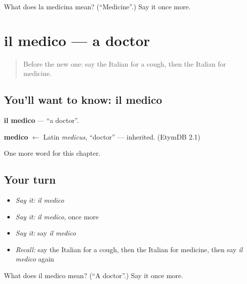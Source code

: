 \begin{tcolorbox}[breakable,colback=teal!4,colframe=teal!35!black,title={Before you move on}]
What does la medicina mean? (\textquotedblleft{}Medicine\textquotedblright{}.) Say it once more.
\end{tcolorbox}
\section[il medico]{il medico — a doctor}

\label{lesson:IT-C41-medico}



\begin{quote}
Before the new one: say the Italian for a cough, then the Italian for medicine.
\end{quote}

\subsection*{You'll want to know: il medico}
\textbf{il medico} — \textquotedblleft{}a doctor\textquotedblright{}.

\begin{cousinweb}
\textbf{medico} $\leftarrow$ Latin \emph{medicus}, \textquotedblleft{}doctor\textquotedblright{} — inherited. (EtymDB 2.1)
\end{cousinweb}

\begin{grammarlens}[title={What you've built}]
One more word for this chapter.
\end{grammarlens}

\subsection*{Your turn}
\begin{itemize}
\raggedright
  \item \emph{Say it:} \emph{il medico}
  \item \emph{Say it:} \emph{il medico}, once more
  \item \emph{Say it:} say \emph{il medico}
  \item \emph{Recall:} say the Italian for a cough, then the Italian for medicine, then say \emph{il medico} again
\end{itemize}

\begin{tcolorbox}[breakable,colback=teal!4,colframe=teal!35!black,title={Before you move on}]
What does il medico mean? (\textquotedblleft{}A doctor\textquotedblright{}.) Say it once more.
\end{tcolorbox}
